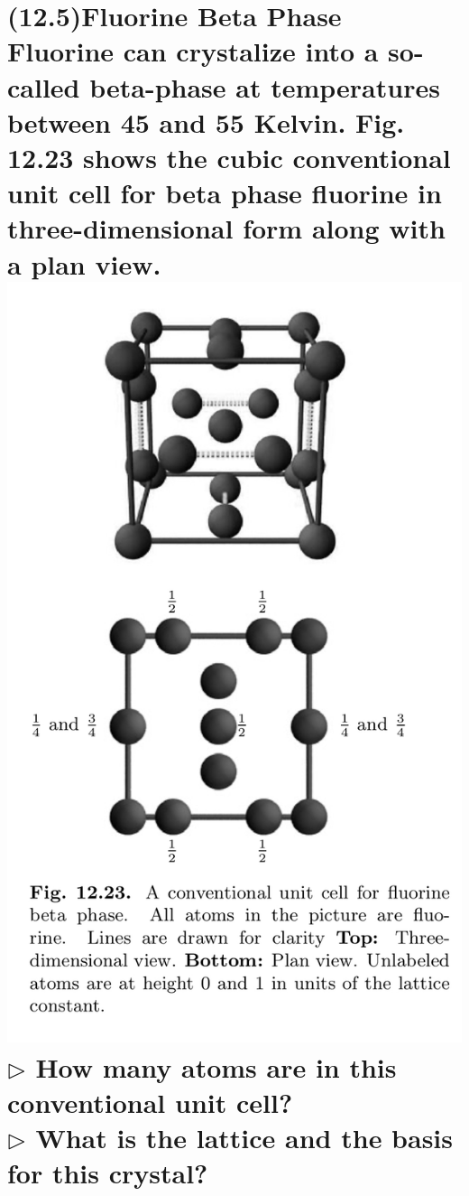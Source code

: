 \documentclass[reqno,a4paper,12pt]{amsart}
\begin{document}
\section{(12.5)\textbf{Fluorine Beta Phase} \\
Fluorine can crystalize into a so-called beta-phase at temperatures between 45 and 55 Kelvin. Fig. 12.23 shows the cubic conventional unit cell for beta phase fluorine in three-dimensional form along with a plan view. \\
\includegraphics[scale = 0.19]{12.5.jpeg} \\
$\triangleright$ How many atoms are in this conventional unit cell? \\
$\triangleright$ What is the lattice and the basis for this crystal? }
\end{document}
